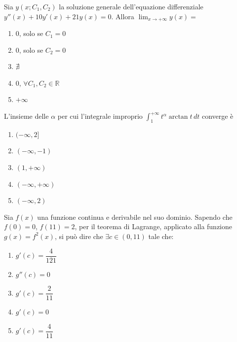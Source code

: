\begin{quiz}
Sia $y(x;C_1,C_2)$ la soluzione generale dell'equazione differenziale $y''(x)+10y'(x)+21y(x)=0$. Allora $\displaystyle\lim_{x\to+\infty}y(x)=$
\begin{enumerate}
\item $0$, solo se $C_1=0$
\item $0$, solo se $C_2=0$
\item $\nexists$
\item $0$, $\forall C_1,C_2\in\mathbb R$
\item $+\infty$
\end{enumerate}
\end{quiz}

\begin{quiz}
L'insieme delle $\alpha$ per cui l'integrale improprio $\displaystyle\int_1^{+\infty}t^\alpha\arctan t\,dt$ converge \`e
\begin{enumerate}
\item $(-\infty,2]$
\item $(-\infty,-1)$
\item $(1,+\infty)$
\item $(-\infty,+\infty)$
\item $(-\infty,2)$
\end{enumerate}
\end{quiz}

\begin{quiz}
Sia $f(x)$ una funzione continua e derivabile nel suo dominio. Sapendo che $f(0)=0$, $f(11)=2$, per il teorema di Lagrange, applicato alla funzione $g(x)=f^2(x)$, si pu\`o dire che $\exists c\in(0,11)$ tale che:
\begin{enumerate}
\item $g'(c)=\dfrac4{121}$
\item $g''(c)=0$
\item $g'(c)=\dfrac2{11}$
\item $g'(c)=0$
\item $g'(c)=\dfrac4{11}$
\end{enumerate}
\end{quiz}

